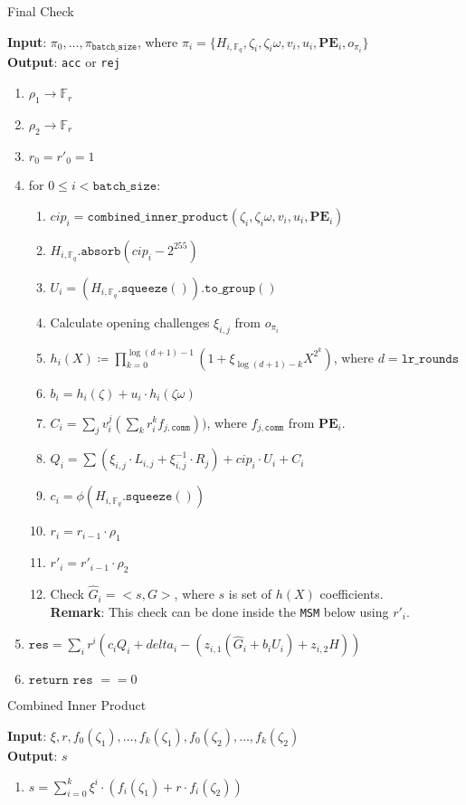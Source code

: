 \begin{algorithm}[H]
\caption{Final Check}
\textbf{Input}: $\pi_0, \dots, \pi_{\texttt{batch\_size}}$, where $\pi_i = \{H_{i, \mathbb{F}_q}, \zeta_i, \zeta_i\omega, v_i, u_i,
		\textbf{PE}_i, o_{\pi_i} \}$ \\
\textbf{Output}: \texttt{acc} or \texttt{rej}
\begin{enumerate}
	\item $\rho_1 \rightarrow \mathbb{F}_r$
	\item $\rho_2 \rightarrow \mathbb{F}_r$
	\item $r_0 = r'_0 = 1$
	\item for $0 \leq i < \texttt{batch\_size}$:
	\begin{enumerate}
		\item $cip_i = \texttt{combined\_inner\_product}(\zeta_i, \zeta_i\omega, v_i, u_i, \textbf{PE}_i)$
		\item $H_{i, \mathbb{F}_q}.\texttt{absorb}(cip_i - 2^{255})$
		\item $U_i = (H_{i, \mathbb{F}_q}.\texttt{squeeze}()).\texttt{to\_group}()$
		\item Calculate opening challenges $\xi_{i, j}$ from $o_{\pi_i}$
		\item $h_i(X) \coloneqq \prod_{k=0}^{\log(d+1) - 1}(1 + \xi_{\log(d+1)-k}X^{2^k})$, where $d = \texttt{lr\_rounds}$
		\item $b_i = h_i(\zeta) + u_i \cdot h_i(\zeta\omega)$
		\item $C_i = \sum\limits_{j}v_i^j(\sum\limits_{k}r_i^k f_{j, \texttt{comm}}))$, where $f_{j, \texttt{comm}}$ from $\textbf{PE}_i$.
		\item $Q_i = \sum (\xi_{i, j} \cdot L_{i, j} + \xi_{i, j}^{-1} \cdot R_j) + cip_i \cdot U_i + C_i$
		\item $c_i = \phi(H_{i, \mathbb{F}_q}.\texttt{squeeze}())$
		\item $r_i = r_{i - 1} \cdot \rho_1$
		\item $r'_i = r'_{i - 1} \cdot \rho_2$
		\item Check $\hat{G}_i = <s, G>$, where $s$ is set of $h(X)$ coefficients. \\
		\textbf{Remark}: This check can be done inside the \texttt{MSM} below using $r'_i$.
	\end{enumerate}
	\item $\texttt{res} = \sum\limits_i r^i (c_i Q_i + delta_i - ( z_{i, 1} (\hat{G}_i + b_i U_i) + z_{i, 2} H ))$
	\item $\texttt{return res } == 0$
\end{enumerate}
\end{algorithm}

\begin{algorithm}[H]
\caption{Combined Inner Product}
\textbf{Input}: $\xi, r, f_0(\zeta_1), \dots, f_k(\zeta_1), f_0(\zeta_2), \dots, f_k(\zeta_2)$ \\ %
\textbf{Output}: $s$
\begin{enumerate}
	\item $s = \sum\limits_{i = 0}^{k} \xi^i \cdot (f_i(\zeta_1) + r \cdot f_i(\zeta_2))$
\end{enumerate}
\end{algorithm}